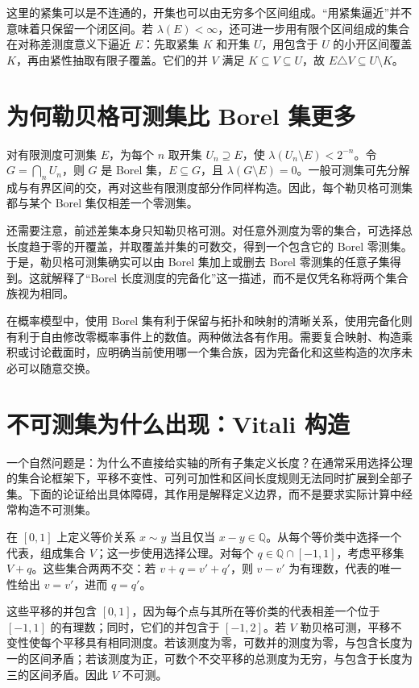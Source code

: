 这里的紧集可以是不连通的，开集也可以由无穷多个区间组成。“用紧集逼近”并不意味着只保留一个闭区间。若 $\lambda(E)<\infty$，还可进一步用有限个区间组成的集合在对称差测度意义下逼近 $E$：先取紧集 $K$ 和开集 $U$，用包含于 $U$ 的小开区间覆盖 $K$，再由紧性抽取有限子覆盖。它们的并 $V$ 满足 $K\subseteq V\subseteq U$，故 $E\triangle V\subseteq U\setminus K$。

\section{为何勒贝格可测集比 Borel 集更多}
对有限测度可测集 $E$，为每个 $n$ 取开集 $U_n\supseteq E$，使 $\lambda(U_n\setminus E)<2^{-n}$。令 $G=\bigcap_nU_n$，则 $G$ 是 Borel 集，$E\subseteq G$，且 $\lambda(G\setminus E)=0$。一般可测集可先分解成与有界区间的交，再对这些有限测度部分作同样构造。因此，每个勒贝格可测集都与某个 Borel 集仅相差一个零测集。

还需要注意，前述差集本身只知勒贝格可测。对任意外测度为零的集合，可选择总长度趋于零的开覆盖，并取覆盖并集的可数交，得到一个包含它的 Borel 零测集。于是，勒贝格可测集确实可以由 Borel 集加上或删去 Borel 零测集的任意子集得到。这就解释了“Borel 长度测度的完备化”这一描述，而不是仅凭名称将两个集合族视为相同。

在概率模型中，使用 Borel 集有利于保留与拓扑和映射的清晰关系，使用完备化则有利于自由修改零概率事件上的数值。两种做法各有作用。需要复合映射、构造乘积或讨论截面时，应明确当前使用哪一个集合族，因为完备化和这些构造的次序未必可以随意交换。

\section{不可测集为什么出现：Vitali 构造}
\label{sec:mt-vitali-set}
一个自然问题是：为什么不直接给实轴的所有子集定义长度？在通常采用选择公理的集合论框架下，平移不变性、可列可加性和区间长度规则无法同时扩展到全部子集。下面的论证给出具体障碍，其作用是解释定义边界，而不是要求实际计算中经常构造不可测集。

在 $[0,1]$ 上定义等价关系 $x\sim y$ 当且仅当 $x-y\in\mathbb Q$。从每个等价类中选择一个代表，组成集合 $V$；这一步使用选择公理。对每个 $q\in\mathbb Q\cap[-1,1]$，考虑平移集 $V+q$。这些集合两两不交：若 $v+q=v'+q'$，则 $v-v'$ 为有理数，代表的唯一性给出 $v=v'$，进而 $q=q'$。

这些平移的并包含 $[0,1]$，因为每个点与其所在等价类的代表相差一个位于 $[-1,1]$ 的有理数；同时，它们的并包含于 $[-1,2]$。若 $V$ 勒贝格可测，平移不变性使每个平移具有相同测度。若该测度为零，可数并的测度为零，与包含长度为一的区间矛盾；若该测度为正，可数个不交平移的总测度为无穷，与包含于长度为三的区间矛盾。因此 $V$ 不可测。


